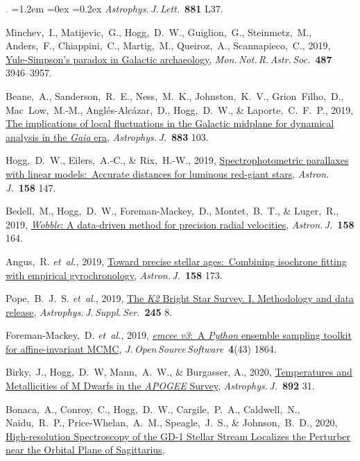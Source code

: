 \documentclass[10pt,letterpaper]{article}
\newcommand{\acronym}[1]{{\small{#1}}}
\newcommand{\foreign}[1]{\textsl{#1}}
\newcommand{\etal}{\foreign{et~al.}}
\newcommand{\project}[1]{\textsl{#1}}
\newcommand{\doi}[2]{\href{http://dx.doi.org/#1}{{#2}}}
\newcommand{\deemph}[1]{\textcolor{grey}{\footnotesize{#1}}}
\newcommand{\pubnumber}[1]{\deemph{{#1}.}}
\newcounter{refpubnum}
\newcommand{\hogglist}{%
    \rightmargin=0in
    \leftmargin=1.2em
    \topsep=0ex
    \partopsep=0pt
    \itemsep=0.2ex
    \parsep=0pt
    \itemindent=-1.0\leftmargin
    \listparindent=0.0\leftmargin
    \settowidth{\labelsep}{~}
    \usecounter{refpubnum}
  }
\begin{document}
\begin{list}{\pubnumber{\therefpubnum}}{\hogglist}
\textit{Astrophys.\,J.\,Lett.}\ \textbf{881} L37.
\item
Minchev,~I., Matijevic,~G., Hogg,~D.~W., Guiglion,~G., Steinmetz,~M.,
Anders,~F., Chiappini,~C., Martig,~M., Queiroz,~A., Scannapieco,~C., 2019,
\doi{10.1093/mnras/stz1239}{Yule-Simpson's paradox in Galactic archaeology},
\textit{Mon.\,Not.\,R.\,Astr.\,Soc.}\ \textbf{487} 3946--3957.
\item
Beane,~A., Sanderson,~R.~E., Ness,~M.~K., Johnston,~K.~V., Grion~Filho,~D.,
Mac~Low,~M.-M., Angl\'es-Alc\'azar,~D., Hogg,~D.~W., \& Laporte,~C.~F.~P., 2019,
\doi{10.3847/1538-4357/ab3d3c}{The implications of local fluctuations
in the Galactic midplane for dynamical analysis in the \project{Gaia} era},
\textit{Astrophys.\,J.}\ \textbf{883} 103.
\item
Hogg,~D.~W., Eilers,~A.-C., \& Rix,~H.-W., 2019,
\doi{10.3847/1538-3881/ab398c}{Spectrophotometric parallaxes with
linear models:\ Accurate distances for luminous red-giant stars},
\textit{Astron.\,J.}\ \textbf{158} 147.
\item
Bedell,~M., Hogg,~D.~W., Foreman-Mackey,~D., Montet,~B.~T., \& Luger,~R., 2019,
\doi{10.3847/1538-3881/ab40a7}{\project{Wobble}: A data-driven method for precision radial velocities},
\textit{Astron.\,J.}\ \textbf{158} 164.
\item
Angus,~R. \etal, 2019,
\doi{10.3847/1538-3881/ab3c53}{Toward precise stellar ages:\ Combining isochrone fitting with empirical gyrochronology},
\textit{Astron.\,J.}\ \textbf{158} 173.
\item
Pope,~B.~J.~S. \etal, 2019,
\doi{10.3847/1538-4365/ab3d29}{The \project{\acronym{K2}} Bright Star Survey. \acronym{I}. Methodology and data release},
\textit{Astrophys.\,J.\,Suppl.\,Ser.}\ \textbf{245} 8.
\item
Foreman-Mackey,~D. \etal, 2019,
\doi{10.21105/joss.01864}{\project{emcee v3}:\ A \project{Python} ensemble sampling toolkit for affine-invariant \acronym{MCMC}},
\textit{J.\,Open\,Source\,Software}\ \textbf{4}(43) 1864.
\item
Birky,~J., Hogg,~D.~W, Mann,~A.~W., \& Burgasser, A., 2020,
\doi{10.3847/1538-4357/ab7004}{Temperatures and Metallicities of M Dwarfs in the \project{\acronym{APOGEE}} Survey},
\textit{Astrophys.\,J.}\ \textbf{892} 31.
\item
  Bonaca,~A., Conroy,~C., Hogg,~D.~W., Cargile,~P.~A., Caldwell,~N., Naidu,~R.~P.,
  Price-Whelan,~A.~M., Speagle,~J.~S., \& Johnson,~B.~D., 2020,
  \doi{10.3847/2041-8213/ab800c}{High-resolution Spectroscopy of the \acronym{GD-1} Stellar Stream Localizes the Perturber near the Orbital Plane of Sagittarius},

\end{list}
\end{document}
